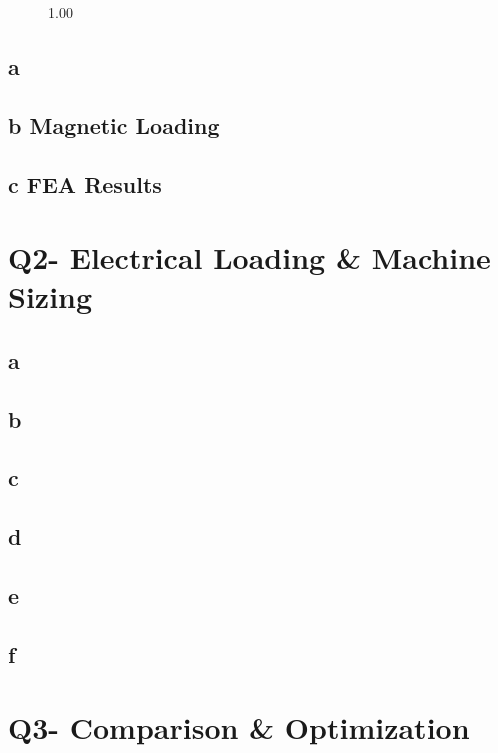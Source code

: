 \documentclass[a4paper, 11pt, titlepage]{article}
\begin{document}
\begin{figure}[b]{1.00\textwidth}
	\caption{}
	\label{subfig:Q1_dist_factor}
\end{figure}

\subsection{a}

\subsection{b Magnetic Loading}

\subsection{c FEA Results}


\section{Q2- Electrical Loading \& Machine Sizing}


\subsection{a}

\subsection{b}

\subsection{c}

\subsection{d}

\subsection{e}

\subsection{f}


\section{Q3- Comparison \& Optimization}
\end{document}
